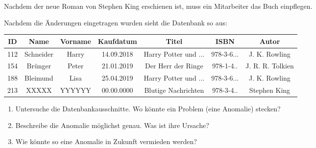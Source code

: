 \documentclass[10pt, a5paper,landscape]{scrartcl}
\begin{document}
Nachdem der neue Roman von Stephen King erschienen ist, muss ein Mitarbeiter das Buch einpflegen.

Nachdem die Änderungen eingetragen wurden sieht die Datenbank so aus:

{\footnotesize
\begin{tabular}{|*{7}{c|}}\hline
	\rowcolor{ngb.tabelle.kopf.hg} ID & Name & Vorname & Kaufdatum & Titel & ISBN & Autor\\ \hline
	112 & Schneider & Harry & 14.09.2018 & Harry Potter und ... & 978-3-6... & J. K. Rowling \\\hline
	154 & Brünger & Peter & 21.01.2019 & Der Herr der Ringe & 978-1-4.. & J. R. R. Tolkien \\\hline
	188 & Bleimund & Lisa & 25.04.2019 & Harry Potter und ... & 978-3-6... & J. K. Rowling \\\hline
	213 & XXXXX & YYYYYY & 00.00.0000 & Blutige Nachrichten & 978-3-4.. & Stephen King \\\hline
\end{tabular}}

\vspace{1em}
\begin{aufgabe}
\begin{enumerate}
	\item Untersuche die Datenbankausschnitte. Wo könnte ein Problem (eine Anomalie) stecken?
	\item Beschreibe die Anomalie möglichst genau. Was ist ihre Ursache?
	\item Wie könnte so eine Anomalie in Zukunft vermieden werden?
\end{enumerate}
\end{aufgabe}
\end{document}
